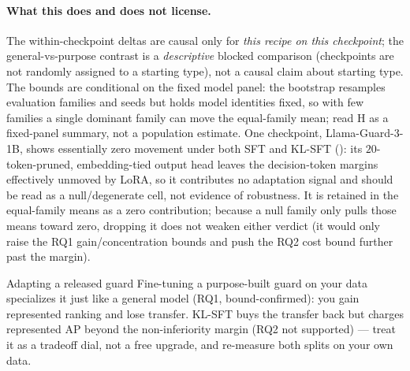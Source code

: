 \paragraph{What this does and does not license.}
The within-checkpoint deltas are causal only for \emph{this recipe on this checkpoint}; the
general-vs-purpose contrast is a \emph{descriptive} blocked comparison (checkpoints are not randomly
assigned to a starting type), not a causal claim about starting type. The bounds are conditional on the
fixed model panel: the bootstrap resamples evaluation families and seeds but holds model identities
fixed, so with few families a single dominant family can move the equal-family mean; read H as a
fixed-panel summary, not a population estimate. One checkpoint, Llama-Guard-3-1B, shows essentially zero
movement under both SFT and KL-SFT (): its $20$-token-pruned, embedding-tied output
head leaves the decision-token margins effectively unmoved by LoRA, so it contributes no adaptation
signal and should be read as a null/degenerate cell, not evidence of robustness. It is retained in the
equal-family means as a zero contribution; because a null family only pulls those means toward zero,
dropping it does not weaken either verdict (it would only raise the RQ1 gain/concentration bounds and
push the RQ2 cost bound further past the margin).

\begin{takeaway}{Adapting a released guard}
Fine-tuning a purpose-built guard on your data specializes it just like a general model (RQ1,
bound-confirmed): you gain represented ranking and lose transfer. KL-SFT buys the transfer back but
charges represented AP beyond the non-inferiority margin (RQ2 not supported) --- treat it as a
tradeoff dial, not a free upgrade, and re-measure both splits on your own data.
\end{takeaway}
